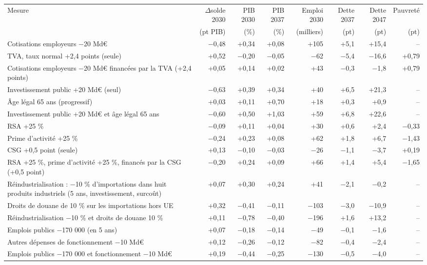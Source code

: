 \begin{tabular}{p{5.2cm}rrrrrrr}
\toprule
Mesure & $\Delta$solde 2030 & PIB 2030 & PIB 2037 & Emploi 2030 & Dette 2037 & Dette 2047 & Pauvreté \\
 & (pt PIB) & (\%) & (\%) & (milliers) & (pt) & (pt) & (pt) \\
\midrule
Cotisations employeurs −20 Md€ & $-$0{,}48 & +0{,}34 & +0{,}08 & +105 & +5{,}1 & +15{,}4 & -- \\
TVA, taux normal +2,4 points (seule) & +0{,}52 & $-$0{,}20 & $-$0{,}05 & $-$62 & $-$5{,}4 & $-$16{,}6 & +0{,}79 \\
Cotisations employeurs −20 Md€ financées par la TVA (+2,4 points) & +0{,}05 & +0{,}14 & +0{,}02 & +43 & $-$0{,}3 & $-$1{,}8 & +0{,}79 \\
Investissement public +20 Md€ (seul) & $-$0{,}63 & +0{,}39 & +0{,}34 & +40 & +6{,}5 & +21{,}3 & -- \\
Âge légal 65 ans (progressif) & +0{,}03 & +0{,}11 & +0{,}70 & +18 & +0{,}3 & +0{,}9 & -- \\
Investissement public +20 Md€ et âge légal 65 ans & $-$0{,}60 & +0{,}50 & +1{,}03 & +59 & +6{,}8 & +22{,}6 & -- \\
RSA +25 \% & $-$0{,}09 & +0{,}11 & +0{,}04 & +30 & +0{,}6 & +2{,}4 & $-$0{,}33 \\
Prime d'activité +25 \% & $-$0{,}24 & +0{,}23 & +0{,}08 & +62 & +1{,}8 & +6{,}7 & $-$1{,}43 \\
CSG +0,5 point (seule) & +0{,}13 & $-$0{,}10 & $-$0{,}03 & $-$26 & $-$1{,}1 & $-$3{,}7 & +0{,}19 \\
RSA +25 \%, prime d'activité +25 \%, financés par la CSG (+0,5 point) & $-$0{,}20 & +0{,}24 & +0{,}09 & +66 & +1{,}4 & +5{,}4 & $-$1{,}65 \\
Réindustrialisation : −10 \% d'importations dans huit produits industriels (5 ans, investissement, surcoût) & +0{,}07 & +0{,}30 & +0{,}24 & +41 & $-$2{,}1 & $-$0{,}2 & -- \\
Droits de douane de 10 \% sur les importations hors UE & +0{,}32 & $-$0{,}41 & $-$0{,}11 & $-$103 & $-$3{,}0 & $-$10{,}9 & -- \\
Réindustrialisation −10 \% et droits de douane 10 \% & +0{,}11 & $-$0{,}78 & $-$0{,}40 & $-$196 & +1{,}6 & +13{,}2 & -- \\
Emplois publics −170 000 (en 5 ans) & +0{,}07 & $-$0{,}18 & $-$0{,}14 & $-$49 & $-$0{,}1 & $-$1{,}6 & -- \\
Autres dépenses de fonctionnement −10 Md€ & +0{,}12 & $-$0{,}26 & $-$0{,}12 & $-$82 & $-$0{,}4 & $-$2{,}4 & -- \\
Emplois publics −170 000 et fonctionnement −10 Md€ & +0{,}19 & $-$0{,}44 & $-$0{,}25 & $-$130 & $-$0{,}5 & $-$4{,}0 & -- \\
\bottomrule
\end{tabular}

